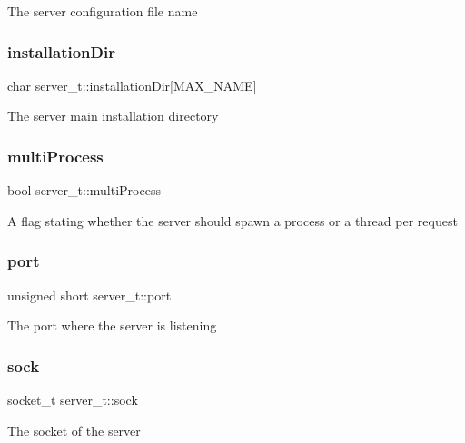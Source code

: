 The server configuration file name \mbox{\label{structserver__t_ae5ccab8bd0fb6744f89ae6a7e13d8553}} 
\subsubsection{\texorpdfstring{installation\+Dir}{installationDir}}
{\footnotesize\ttfamily char server\+\_\+t\+::installation\+Dir\mbox{[}M\+A\+X\+\_\+\+N\+A\+ME\mbox{]}}

The server main installation directory \mbox{\label{structserver__t_a04e5158f927016ae6577600862d8750d}} 
\subsubsection{\texorpdfstring{multi\+Process}{multiProcess}}
{\footnotesize\ttfamily bool server\+\_\+t\+::multi\+Process}

A flag stating whether the server should spawn a process or a thread per request \mbox{\label{structserver__t_ac60a631d2267e34f3b5dd3555ae3ab43}} 
\subsubsection{\texorpdfstring{port}{port}}
{\footnotesize\ttfamily unsigned short server\+\_\+t\+::port}

The port where the server is listening \mbox{\label{structserver__t_a51c1726304d4644523c35656c5f9b20b}} 
\subsubsection{\texorpdfstring{sock}{sock}}
{\footnotesize\ttfamily socket\+\_\+t server\+\_\+t\+::sock}

The socket of the server \mbox{\label{structserver__t_a515d831aa349c908c0a2c0e86b5e1c43}} 
